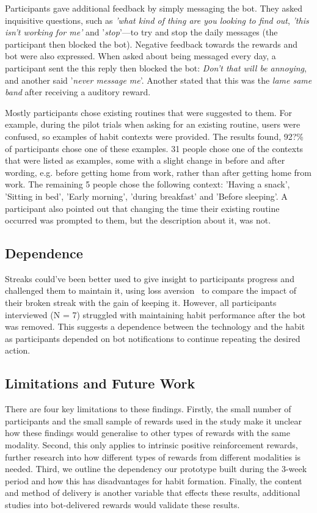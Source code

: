 \documentclass{scaffold/sigchi}
\begin{document}
Participants gave additional feedback by simply messaging the bot. They asked inquisitive questions, such as \textit{'what kind of thing are you looking to find out}, \textit{'this isn't working for me'} and '\textit{stop}'---to try and stop the daily messages (the participant then blocked the bot). Negative feedback towards the rewards and bot were also expressed. When asked about being messaged every day, a participant sent the this reply then blocked the bot: \textit{Don't that will be annoying}, and another said '\textit{never message me}'. Another stated that this was the \textit{lame same band} after receiving a auditory reward.

Mostly participants chose existing routines that were suggested to them. For example, during the pilot trials when asking for an existing routine, users were confused, so examples of habit contexts were provided. The results found, 92?\% of participants chose one of these examples. 31 people chose one of the contexts that were listed as examples, some with a slight change in before and after wording, e.g. before getting home from work, rather than after getting home from work. The remaining 5 people chose the following context: 'Having a snack', 'Sitting in bed', 'Early morning', 'during breakfast' and 'Before sleeping'. A participant also pointed out that changing the time their existing routine occurred was prompted to them, but the description about it, was not.


\subsection{Dependence}
Streaks could've been better used to give insight to participants progress and challenged them to maintain it, using loss aversion~\cite{loss_aversion} to compare the impact of their broken streak with the gain of keeping it. However, all participants interviewed (N = 7) struggled with maintaining habit performance after the bot was removed. This suggests a dependence between the technology and the habit as participants depended on bot notifications to continue repeating the desired action.


\subsection{Limitations and Future Work}
There are four key limitations to these findings. Firstly, the small number of participants and the small sample of rewards used in the study make it unclear how these findings would generalise to other types of rewards with the same modality. Second, this only applies to intrinsic positive reinforcement rewards, further research into how different types of rewards from different modalities is needed. Third, we outline the dependency our prototype built during the 3-week period and how this has disadvantages for habit formation. Finally, the content and method of delivery is another variable that effects these results, additional studies into bot-delivered rewards would validate these results. 
\end{document}
